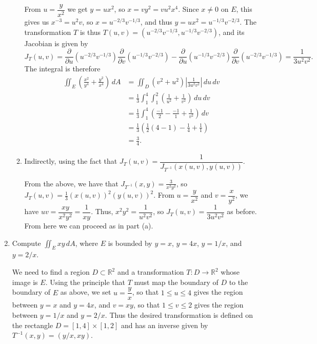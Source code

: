 \documentclass[12pt,letterpaper]{article}
\newcommand{\R}{\mathbb{R}}
\newcommand{\di}{\displaystyle}
\begin{document}
\begin{enumerate}
\begin{enumerate}
\medskip

From $u=\dfrac{y}{x^2}$ we get $y=ux^2$, so $x=vy^2 = vu^2x^4$. Since $x\neq 0$ on $E$, this gives us $x^{-3} = u^2v$, so $x = u^{-2/3}v^{-1/3}$, and thus $y=ux^2 = u^{-1/3}v^{-2/3}$. The transformation $T$ is thus $T(u,v) = (u^{-2/3}v^{-1/3},u^{-1/3}v^{-2/3})$, and its Jacobian is given by
\[
J_T(u,v) = \frac{\partial}{\partial u}(u^{-2/3}v^{-1/3})\frac{\partial}{\partial v}(u^{-1/3}v^{-2/3})-\frac{\partial}{\partial u}(u^{-1/3}v^{-2/3})\frac{\partial}{\partial v}(u^{-2/3}v^{-1/3})=\frac{1}{3u^2v^2}.
\]
The integral is therefore
\begin{align*}
\iint_E\left(\frac{x^2}{y^4}+\frac{y^2}{x^4}\right)\,dA & = \iint_D\left(v^2+u^2\right)\left| \frac{1}{3u^2v^2}\right|\,du\,dv\\
& = \frac{1}{3}\int_1^4\int_1^2 \left(\frac{1}{u^2}+\frac{1}{v^2}\right)\,du\,dv\\
& = \frac{1}{3}\int_1^4\left(\frac{-1}{2}-\frac{-1}{1} +\frac{1}{v^2}\right)\, dv\\
& = \frac{1}{3}\left(\frac{1}{2}(4-1)-\frac{1}{4}+\frac{1}{1}\right)\\
& = \frac{3}{4}.
\end{align*}

\item Indirectly, using the fact that $J_T(u,v) = \dfrac{1}{J_{T^{-1}}(x(u,v),y(u,v))}$.

\medskip

From the above, we have that $J_{T^{-1}}(x,y) = \frac{3}{x^2y^2}$, so $J_T(u,v) = \frac{1}{3}(x(u,v))^2(y(u,v))^2$. From $u=\dfrac{y}{x^2}$ and $v=\dfrac{x}{y^2}$, we have $uv = \dfrac{xy}{x^2y^2} = \dfrac{1}{xy}$. Thus, $x^2y^2 = \dfrac{1}{u^2v^2}$, so $J_T(u,v) = \dfrac{1}{3u^2v^2}$ as before. From here we can proceed as in part (a).
\end{enumerate}

\bigskip

\item Compute $\di \iint_E xy \, dA$, where $E$ is bounded by $y=x$, $y=4x$, $y=1/x$, and $y=2/x$.

\bigskip

 We need to find a region $D\subset \R^2$ and a transformation $T:D\to \R^2$ whose image is $E$. Using the principle that $T$ must map the boundary of $D$ to the boundary of $E$ as above, we set $u=\dfrac{y}{x}$, so that $1\leq u\leq 4$ gives the region between $y=x$ and $y=4x$, and $v=xy$, so that $1\leq v\leq 2$ gives the region between $y=1/x$ and $y=2/x$. Thus the desired transformation is defined on the rectangle $D = [1,4]\times [1,2]$ and has an inverse given by $T^{-1}(x,y) = (y/x,xy)$.


\end{enumerate}
\end{document}
